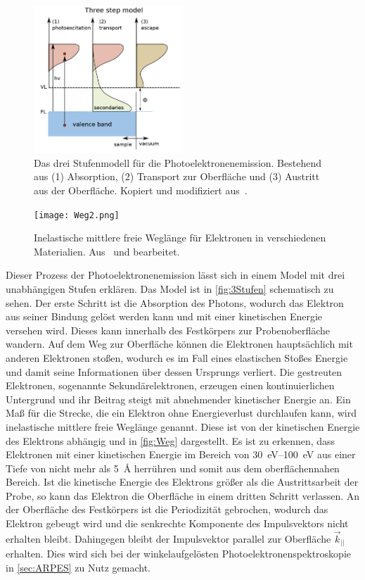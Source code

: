         \begin{figure}
            \centering
            \includegraphics[width=0.5\textwidth]{3Stufen}
            \caption{Das drei Stufenmodell für die Photoelektronenemission.
            Bestehend aus (1) Absorption, (2) Transport zur Oberfläche und (3) Austritt aus der Oberfläche.
            Kopiert und modifiziert aus~\cite{zhang_synchrotron_2018}.}
            \label{fig:3Stufen}
        \end{figure}
        \begin{figure}
            \centering
            \texttt{[image: Weg2.png]}
            \caption{Inelastische mittlere freie Weglänge für Elektronen in verschiedenen Materialien. Aus~\cite{Hüfner} und bearbeitet.}
            \label{fig:Weg}
        \end{figure}
        Dieser Prozess der Photoelektronenemission lässt sich in einem Model mit drei unabhängigen Stufen erklären.
        Das Model ist in \autoref{fig:3Stufen} schematisch zu sehen.
        Der erste Schritt ist die Absorption des Photons, wodurch das Elektron aus seiner Bindung gelöst werden kann und mit einer kinetischen Energie versehen wird.
        Dieses kann innerhalb des Festkörpers zur Probenoberfläche wandern.
        Auf dem Weg zur Oberfläche können die  Elektronen hauptsächlich mit anderen Elektronen stoßen, wodurch es im Fall eines elastischen Stoßes Energie und damit seine Informationen über dessen Ursprungs verliert.
        Die gestreuten Elektronen, sogenannte Sekundärelektronen, erzeugen einen kontinuierlichen Untergrund und ihr Beitrag steigt mit abnehmender kinetischer Energie an.
        Ein Maß für die Strecke, die ein Elektron ohne Energieverlust durchlaufen kann, wird inelastische mittlere freie Weglänge genannt.
        Diese ist von der kinetischen Energie des Elektrons abhängig und in \autoref{fig:Weg} dargestellt.
        Es ist zu erkennen, dass Elektronen mit einer kinetischen Energie im Bereich von \SIrange{30}{100}{\electronvolt} aus einer Tiefe von nicht mehr als \SI{5}{\angstrom} herrühren und somit aus dem oberflächennahen Bereich.
        Ist die kinetische Energie des Elektrons größer als die Austrittsarbeit der Probe, so kann das Elektron die Oberfläche in einem dritten Schritt verlassen.
        An der Oberfläche des Festkörpers ist die Periodizität gebrochen, wodurch das Elektron gebeugt wird und die senkrechte Komponente des Impulsvektors nicht erhalten bleibt.
        Dahingegen bleibt der Impulsvektor parallel zur Oberfläche $\vec{k}_{||}$ erhalten.
        Dies wird sich bei der winkelaufgelösten Photoelektronenspektroskopie in \autoref{sec:ARPES} zu Nutz gemacht.

